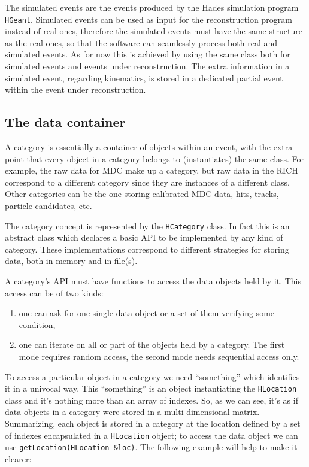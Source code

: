 The simulated events are the events produced by the Hades simulation 
program \verb+HGeant+. Simulated events can be used as input for the 
reconstruction program instead of real ones, therefore the simulated 
events must have the same structure as the real ones, so that the 
software can seamlessly process both real and simulated events. As 
for now this is achieved by using the same class both for simulated 
events and events under reconstruction.
The extra information in a simulated event, regarding kinematics, 
is stored in a dedicated partial event within the event under 
reconstruction.



\subsection{The data container}

A category is essentially a container of objects within an event, with 
the extra point that every object in a category belongs to (instantiates) 
the same class. For example, the raw data for MDC make up a category, 
but raw data in the RICH correspond to a different category since they 
are instances of a different class. Other categories can be the one 
storing calibrated MDC data, hits, tracks, particle candidates, etc.

The category concept is represented by the \verb+HCategory+ class. In 
fact this is an abstract class which declares a basic API to be implemented 
by any kind of category. These implementations correspond to different 
strategies for storing data, both in memory and in file(s). 



A category's API must have functions to access the data objects held by it. 
This access can be of two kinds: 
\begin{enumerate}
\item one can ask for one single data object or a set of them verifying some condition, 
\item one can iterate on all or part of the objects held by a category. The first mode requires random access, the second mode needs sequential access only.
\end{enumerate}

To access a particular object in a category we need ``something'' which 
identifies it in a univocal way. This ``something'' is an object instantiating 
the \verb+HLocation+ class and it's nothing more than an array of indexes. 
So, as we can see, it's as if data objects in a category were stored in a 
multi-dimensional matrix. Summarizing, each object is stored in a category 
at the location defined by a set of indexes encapsulated in a \verb+HLocation+ 
object; to access the data object we can use \verb+getLocation(HLocation &loc)+. 
The following example will help to make it clearer:

